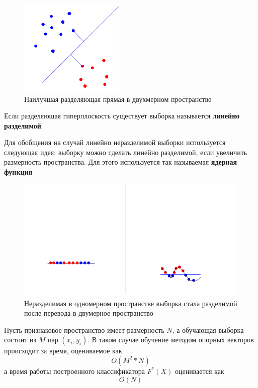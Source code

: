 \begin{figure}[h]
\begin{center}
\includegraphics[width=5cm]{img/svm}
\end{center}
\caption{Наилучшая разделяющая прямая в двухмерном пространстве}
\label{svm}
\end{figure}

Если разделяющая гиперплоскость существует выборка называется \textbf{линейно разделимой}.

Для обобщения на случай линейно неразделимой выборки используется следующая идея: выборку можно сделать линейно разделимой, если увеличить размерность пространства. Для этого используется так называемая \textbf{ядерная функция}

\begin{figure}[h]
\begin{center}
\includegraphics[width=15cm]{img/svm2}
\end{center}
\caption{Неразделимая в одномерном пространстве выборка стала разделимой после перевода в двумерное пространство}
\label{svm-kernel}
\end{figure}

Пусть признаковое пространство имеет размерность $N$, а обучающая выборка состоит из $M$ пар $(x_i, y_i)$. В таком случае обучение методом опорных векторов происходит за время, оцениваемое как
\begin{equation}
O(M^2*N)
\end{equation}
а время работы построенного классификатора $F^*(X)$ оценивается как 
\begin{equation}
O(N)
\end{equation}


